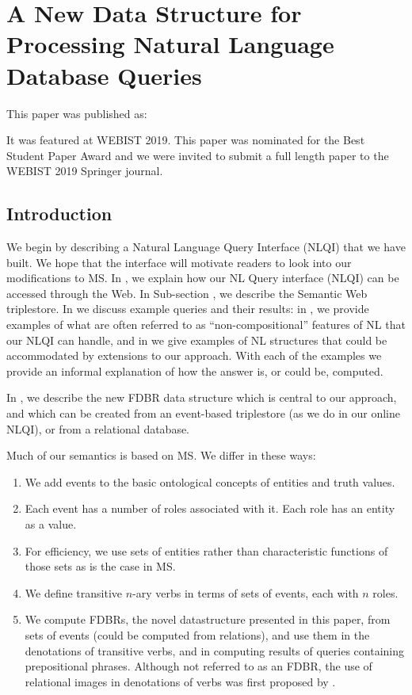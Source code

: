 \documentclass[../main.tex]{subfiles}
\begin{document}
\chapter{A New Data Structure for Processing Natural Language Database Queries}
\begin{refsection}

This paper was published as:


It was featured at WEBIST 2019.  This paper was nominated for the Best Student Paper Award and we were invited to submit a full length paper to the WEBIST 2019 Springer journal.

\label{chapter:webist2019conf}


\section{Introduction}
We begin by describing a Natural Language Query Interface (NLQI) that we have built. We hope that the interface will motivate readers to look into our modifications to MS. In , we explain how our NL Query  interface (NLQI) can be accessed through the Web. In Sub-section , we describe the Semantic Web triplestore. In  we discuss example queries and their results: in , we provide  examples of what are often referred to as ``non-compositional'' features of NL  that our NLQI can handle, and in  we give  examples of NL structures that could be accommodated by extensions to our approach. With each of the examples we provide an informal explanation of how the answer is, or could be, computed.

In , we describe the new FDBR data structure which is central to our approach, and which can be created from an event-based triplestore (as we do in our online NLQI), or from a relational database.

Much of our semantics is based on MS. We differ in these ways:
\begin{enumerate}
	\item We add events to the basic ontological concepts of entities and truth values.
	\item Each event has a number of roles associated with it. Each role has an entity as a value.
	\item For efficiency, we use sets of entities rather than characteristic functions of those sets as is the case in MS.
	\item We define transitive $n$-ary verbs in terms of sets of events, each with $n$ roles.
	\item We compute FDBRs, the novel datastructure presented in this paper, from sets of events (could be computed from relations), and use them in the denotations of transitive verbs, and in computing results of queries containing prepositional phrases. Although not referred to as an FDBR, the use of relational images in denotations of verbs was first proposed by \cite{frost1989constructing}.
\end{enumerate}


\end{refsection}
\end{document}
